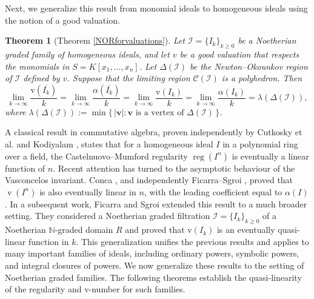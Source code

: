 \documentclass[11pt,reqno,a4paper]{amsart}
\newtheorem{theorem}{Theorem}[section]
\theoremstyle{definition}
\begin{document}
Next, we generalize this result from monomial ideals to homogeneous ideals using the notion of a good valuation.


\begin{theorem}[Theorem \ref{NORforvaluations}]
    


Let $\mathcal{I} = \{I_k\}_{k \ge 0}$ be a Noetherian graded family of homogeneous ideals, 
and let $v$ be a good valuation that respects the monomials in $S = K[x_1, \dots, x_n]$. 
Let $\Delta(\mathcal{I})$ be the Newton--Okounkov region of 
$\mathcal{I}$ defined by $v$.  Suppose that the limiting region $\mathcal{C}(\mathcal{I})$ is a polyhedron. Then
\[
\lim_{k \to \infty} \frac{\mathrm{v}(\overline{I_k})}{k} 
= \lim_{k \to \infty} \frac{\alpha(\overline{I_k})}{k}
= \lim_{k \to \infty} \frac{\mathrm{v}(I_k)}{k}
= \lim_{k \to \infty} \frac{\alpha(I_k)}{k}
= \lambda(\Delta(\mathcal{I})),
\]
where $\lambda(\Delta(\mathcal{I})) := \min\{\,|\mathbf{v}| : \mathbf{v} \text{ is a vertex of } \Delta(\mathcal{I})\,\}$.


\end{theorem}



A classical result in commutative algebra, proven independently by Cutkosky et al. \cite{CutkoskyHerzogTrung99} and Kodiyalam \cite{Kodiyalam00}, states that for a homogeneous ideal \(I\) in a polynomial ring over a field, the Castelnuovo--Mumford regularity \(\operatorname{reg}(I^n)\) is eventually a linear function of \(n\). Recent attention has turned to the asymptotic behaviour of the Vasconcelos invariant. Conca \cite{Conca24}, and independently Ficarra--Sgroi \cite{FicarraSgroi23}, proved that \(\operatorname{v}(I^n)\) is also eventually linear in \(n\), with the leading coefficient equal to  \(\alpha(I)\). In a subsequent work, Ficarra and Sgroi \cite{FicarraSgroi24} extended this result to a much broader setting. They considered a Noetherian graded filtration \(\mathcal{I} = \{I_{k}\}_{k\ge 0}\) of a Noetherian \(\mathbb{N}\)-graded domain \(R\) and proved that  \(\mathrm{v}(I_{k})\) is an eventually quasi-linear function in \(k\). This generalization unifies the previous results and applies to many important families of ideals, including ordinary powers, symbolic powers, and integral closures of powers. We now generalize these results to the setting of Noetherian graded families. The following theorems establish the quasi-linearity of the regularity and v-number for such families.
\end{document}
